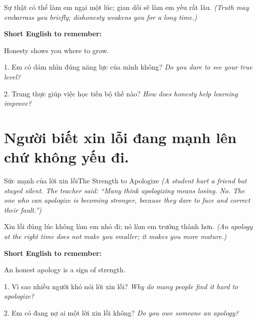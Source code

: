 \begin{baihoc}
Sự thật có thể làm em ngại một lúc; gian dối sẽ làm em yếu rất lâu.
\textit{(Truth may embarrass you briefly; dishonesty weakens you for a long time.)}
\end{baihoc}

\begin{ghinhoanh}
\textbf{Short English to remember:}

Honesty shows you where to grow.

\end{ghinhoanh}

\begin{tuhocnhanh}
1. Em có dám nhìn đúng năng lực của mình không? \textit{Do you dare to see your true level?}

2. Trung thực giúp việc học tiến bộ thế nào? \textit{How does honesty help learning improve?}
\end{tuhocnhanh}
\ngancach

\section{Người biết xin lỗi đang mạnh lên chứ không yếu đi.}
\begin{truyen}{Sức mạnh của lời xin lỗi}{The Strength to Apologize}
\textit{(A student hurt a friend but stayed silent. The teacher said: ``Many think apologizing means losing. No. The one who can apologize is becoming stronger, because they dare to face and correct their fault.'')}
\end{truyen}

\begin{baihoc}
Xin lỗi đúng lúc không làm em nhỏ đi; nó làm em trưởng thành hơn.
\textit{(An apology at the right time does not make you smaller; it makes you more mature.)}
\end{baihoc}

\begin{ghinhoanh}
\textbf{Short English to remember:}

An honest apology is a sign of strength.

\end{ghinhoanh}

\begin{tuhocnhanh}
1. Vì sao nhiều người khó nói lời xin lỗi? \textit{Why do many people find it hard to apologize?}

2. Em có đang nợ ai một lời xin lỗi không? \textit{Do you owe someone an apology?}
\end{tuhocnhanh}
\ngancach

